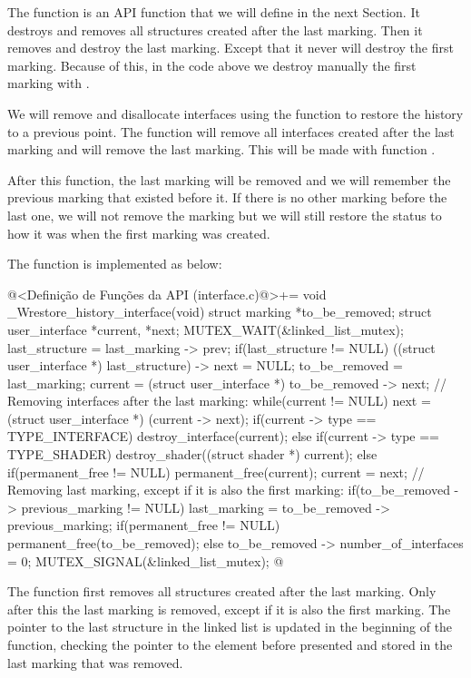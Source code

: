 The function  is an API
function that we will define in the next Section. It destroys and
removes all structures created after the last marking. Then it removes
and destroy the last marking. Except that it never will destroy the
first marking. Because of this, in the code above we destroy manually
the first marking with .


We will remove and disallocate interfaces using the function to
restore the history to a previous point. The function will remove all
interfaces created after the last marking and will remove the last
marking. This will be made with
function .

After this function, the last marking will be removed and we will
remember the previous marking that existed before it. If there is no
other marking before the last one, we will not remove the marking but
we will still restore the status to how it was when the first marking
was created.

The function is implemented as below:

\iniciocodigo
@<Definição de Funções da API (interface.c)@>+=
void _Wrestore_history_interface(void){
  struct marking *to_be_removed;
  struct user_interface *current, *next;
  MUTEX_WAIT(&linked_list_mutex);
  last_structure = last_marking -> prev;
  if(last_structure != NULL)
    ((struct user_interface *) last_structure) -> next = NULL;
  to_be_removed = last_marking;
  current = (struct user_interface *) to_be_removed -> next;
  // Removing interfaces after the last marking:
  while(current != NULL){
    next = (struct user_interface *) (current -> next);
    if(current -> type == TYPE_INTERFACE)
      destroy_interface(current);
    else if(current -> type == TYPE_SHADER)
      destroy_shader((struct shader *) current);
    else if(permanent_free != NULL)
      permanent_free(current);
    current = next;
  }
  // Removing last marking, except if it is also the first marking:
  if(to_be_removed -> previous_marking != NULL){
    last_marking = to_be_removed -> previous_marking;
    if(permanent_free != NULL)
      permanent_free(to_be_removed);
  }
  else
    to_be_removed -> number_of_interfaces = 0;
  MUTEX_SIGNAL(&linked_list_mutex);
}
@
\fimcodigo

The function first removes all structures created after the last
marking. Only after this the last marking is removed, except if it is
also the first marking. The pointer to the last structure in the
linked list is updated in the beginning of the function, checking the
pointer to the element before presented and stored in the last
marking that was removed.

